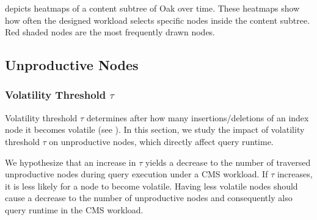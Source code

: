\documentclass[abstracton,12pt]{scrartcl}
\theoremstyle{definition}
\begin{document}
 depicts heatmaps of a content subtree of Oak over time.
These heatmaps show how often the designed workload selects specific nodes
inside the content subtree. Red shaded nodes are the most frequently drawn nodes.





\subsection{Unproductive Nodes}

\label{sec:unproductive-nodes-experiment}

\subsubsection{Volatility Threshold $\tau$}

\label{sec:threshold}

Volatility threshold $\tau$ determines after how many insertions/deletions of an index node
it becomes volatile (see ). In this section, we study the impact of
volatility threshold $\tau$ on unproductive nodes, which directly affect query runtime.

We hypothesize that an increase in $\tau$ yields a decrease to the number of
traversed unproductive nodes during query execution under a CMS workload. If
$\tau$ increases, it is
less likely for a node to become volatile. Having less volatile nodes should
cause a decrease to the number of unproductive nodes and consequently also query
runtime in the CMS workload.
\end{document}
